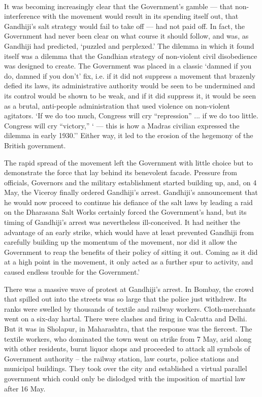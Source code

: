 \paragraph*{}
It was becoming increasingly clear that the Government's gamble --- that non-interference with the movement would result in its spending itself out, that Gandhiji's salt strategy would fail to take off --- had not paid off. In fact, the Government had never been clear on what course it should follow, and was, as Gandhiji had predicted, `puzzled and perplexed.' The dilemma in which it found itself was a dilemma that the Gandhian strategy of non-violent civil disobedience was designed to create. The Government was placed in a classic `damned if you do, damned if you don't' fix, i.e. if it did not suppress a movement that brazenly defied its laws, its administrative authority would be seen to be undermined and its control would be shown to be weak, and if it did suppress it, it would be seen as a brutal, anti-people administration that used violence on non-violent agitators. `If we do too much, Congress will cry ``repression'' ... if we do too little. Congress will cry ``victory,'' ` --- this is how a Madras civilian expressed the dilemma in early 1930.'' Either way, it led to the erosion of the hegemony of the British government.

The rapid spread of the movement left the Government with little choice but to demonstrate the force that lay behind its benevolent facade. Pressure from officials, Governors and the military establishment started building up, and, on 4 May, the Viceroy finally ordered Gandhiji's arrest. Gandhiji's announcement that he would now proceed to continue his defiance of the salt laws by leading a raid on the Dharasana Salt Works certainly forced the Government's hand, but its timing of Gandhiji's arrest was nevertheless ill-conceived. It had neither the advantage of an early strike, which would have at least prevented Gandhiji from carefully building up the momentum of the movement, nor did it allow the Government to reap the benefits of their policy of sitting it out. Coming as it did at a high point in the movement, it only acted as a further spur to activity, and caused endless trouble for the Government.'

There was a massive wave of protest at Gandhiji's arrest. In Bombay, the crowd that spilled out into the streets was so large that the police just withdrew. Its ranks were swelled by thousands of textile and railway workers. Cloth-merchants went on a six-day hartal. There were clashes and firing in Calcutta and Delhi. But it was in Sholapur, in Maharashtra, that the response was the fiercest. The textile workers, who dominated the town went on strike from 7 May, arid along with other residents, burnt liquor shops and proceeded to attack all symbols of Government authority -- the railway station, law courts, police stations and municipal buildings. They took over the city and established a virtual parallel government which could only be dislodged with the imposition of martial law after 16 May.

